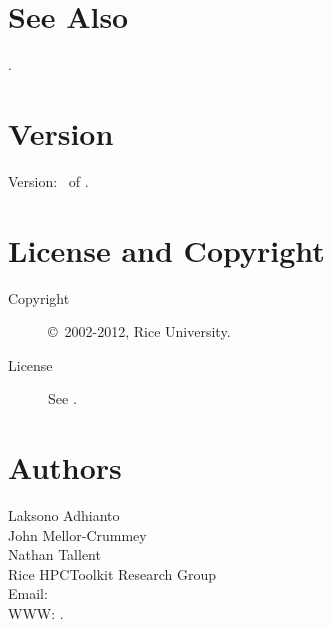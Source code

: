 \documentclass[english]{article}
\begin{document}



\section{See Also}

.

\section{Version}

Version: \Version\ of \Date.

\section{License and Copyright}

\begin{description}
\item[Copyright] \copyright\ 2002-2012, Rice University.
\item[License] See .
\end{description}

\section{Authors}

\noindent
Laksono Adhianto \\
John Mellor-Crummey \\
Nathan Tallent \\
Rice HPCToolkit Research Group \\
Email:  \\
WWW: .

\LatexManEnd
\end{document}
